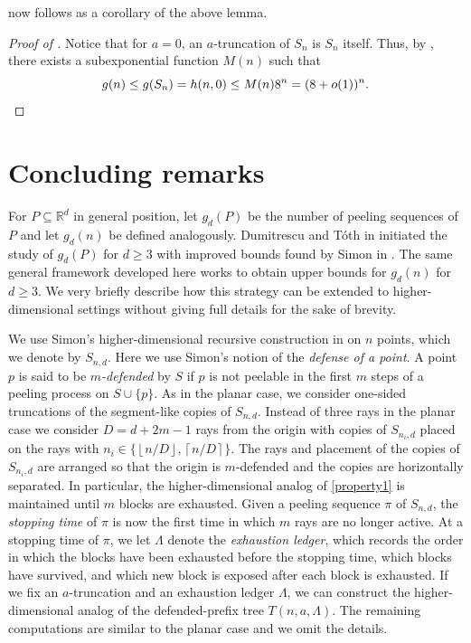 \documentclass[11pt]{amsart}
\theoremstyle{definition}
\newcommand{\floor}[1]{\left\lfloor #1 \right\rfloor}
\newcommand{\ceil}[1]{\left\lceil #1 \right\rceil}
\begin{document}
 now follows as a corollary of the above lemma.
\begin{proof}[Proof of ]
 Notice that for $a=0$, an $a$-truncation of $S_n$ is $S_n$ itself. Thus, by , there exists a subexponential function $M(n)$ such that
 \begin{equation*}
     g(n) \le g(S_n) = h(n,0) \le M(n)8^n = (8+o(1))^n.\qedhere
 \end{equation*} 
\end{proof}

\section{Concluding remarks}
For $P \subseteq \mathbb{R}^d$ in general position, 
let $g_d(P)$ be the number of peeling sequences of $P$ 
and let $g_d(n)$ be defined analogously. 
Dumitrescu and T\'oth in \cite{dumitrescuToth2025peeling} 
initiated the study of $g_d(P)$ for $d\geq 3$ 
with improved bounds found by Simon in \cite{simon2025minimum}. 
The same general framework developed here works to obtain upper bounds for $g_d(n)$ for $d\geq 3$. We very briefly describe how this strategy can be extended to higher-dimensional settings without giving full details for the sake of brevity. 
\par 
We use Simon's 
higher-dimensional recursive 
construction in \cite{simon2025minimum} on $n$ points, which 
we denote by $S_{n,d}$. 
Here we use Simon's notion 
of the \emph{defense of a point}. 
A point $p$ is said to be 
\emph{$m$-defended} by $S$ if $p$ is not peelable in 
the first $m$ steps of a peeling process on $S\cup \{p\}$. 
As in the planar case, we consider one-sided truncations 
of the segment-like copies of $S_{n,d}$. 
Instead of three rays in the planar case we consider 
$D = d+2m-1$ rays from the origin with 
copies of $S_{n_i,d}$ placed on the rays with  
$n_i \in \{\floor{n/D}, \ceil{n/D}\}$. The rays and placement 
of the copies of $S_{n_i,d}$ are arranged so that the origin is 
$m$-defended and the copies are horizontally separated. In particular, the higher-dimensional analog 
of \cref{property1} is maintained until $m$ blocks 
are exhausted. 
Given a peeling sequence $\pi$ of $S_{n,d}$, 
the \emph{stopping time} of $\pi$ is now the first 
time in which $m$ rays are no longer active. At a stopping 
time of $\pi$, we let $\Lambda$ denote the \emph{exhaustion ledger}, 
which records the order in which the blocks have been exhausted  
before the stopping time, which blocks have survived, 
and which new block is exposed after each block is exhausted. 
If we fix an $a$-truncation and an exhaustion ledger $\Lambda$,  
we can construct the higher-dimensional analog of the 
defended-prefix tree $T(n,a,\Lambda)$. 
The remaining computations are similar to the planar 
case and we omit the details. 
\end{document}
